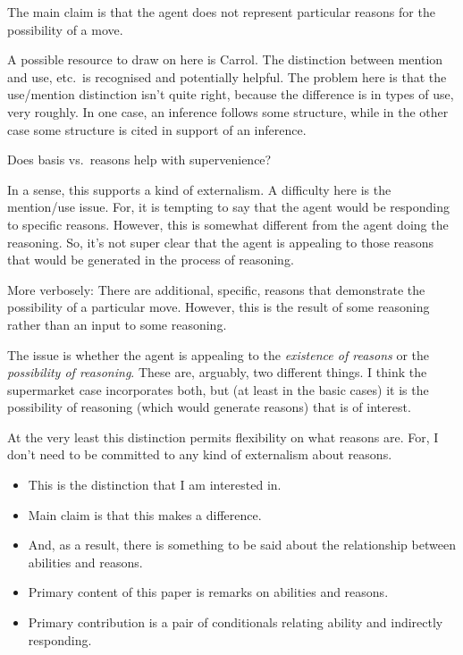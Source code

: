 \documentclass[10pt]{article}
\newcommand{\hozlinedash}[0]{%
  \noindent\hdashrule[0.5ex][c]{\textwidth}{.1pt}{2.5pt}
}
\begin{document}
\begin{note}
  The main claim is that the agent does not represent particular reasons for the possibility of a move.

  A possible resource to draw on here is Carrol.
  The distinction between mention and use, etc.\ is recognised and potentially helpful.
  The problem here is that the use/mention distinction isn't quite right, because the difference is in types of use, very roughly.
  In one case, an inference follows some structure, while in the other case some structure is cited in support of an inference.
\end{note}

\begin{note}
  Does basis vs.\ reasons help with supervenience?

  In a sense, this supports a kind of externalism.
  A difficulty here is the mention/use issue.
  For, it is tempting to say that the agent would be responding to specific reasons.
  However, this is somewhat different from the agent doing the reasoning.
  So, it's not super clear that the agent is appealing to those reasons that would be generated in the process of reasoning.

  More verbosely:
  There are additional, specific, reasons that demonstrate the possibility of a particular move.
  However, this is the result of some reasoning rather than an input to some reasoning.

  The issue is whether the agent is appealing to the \emph{existence of reasons} or the \emph{possibility of reasoning}.
  These are, arguably, two different things.
  I think the supermarket case incorporates both, but (at least in the basic cases) it is the possibility of reasoning (which would generate reasons) that is of interest.

  At the very least this distinction permits flexibility on what reasons are.
  For, I don't need to be committed to any kind of externalism about reasons.
\end{note}


\hozlinedash

\begin{itemize}
\item This is the distinction that I am interested in.
\item Main claim is that this makes a difference.
\item And, as a result, there is something to be said about the relationship between abilities and reasons.
\item Primary content of this paper is remarks on abilities and reasons.
\item Primary contribution is a pair of conditionals relating ability and indirectly responding.
\end{itemize}
\end{document}
